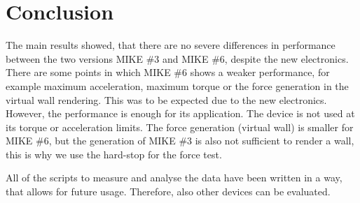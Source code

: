 \section{Conclusion}

The main results showed, that there are no severe differences in performance between the two versions MIKE \#3 and MIKE \#6, despite the new electronics. There are some points in which MIKE \#6 shows a weaker performance, for example maximum acceleration, maximum torque or the force generation in the virtual wall rendering. This was to be expected due to the new electronics. However, the performance is enough for its application. The device is not used at its torque or acceleration limits. The force generation (virtual wall) is smaller for MIKE \#6, but the generation of MIKE \#3 is also not sufficient to render a wall, this is why we use the hard-stop for the force test.

All of the scripts to measure and analyse the data have been written in a way, that allows for future usage. Therefore, also other devices can be evaluated.